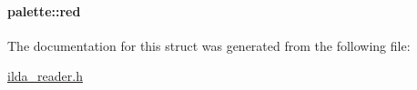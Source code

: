 \paragraph[{\texorpdfstring{red}{red}}]{ palette\+::red}\hypertarget{structpalette_a4ddb05dff589a890711966e7774e75d2}{}\label{structpalette_a4ddb05dff589a890711966e7774e75d2}


The documentation for this struct was generated from the following file\+:\begin{DoxyCompactItemize}
\item 
\hyperlink{ilda__reader_8h}{ilda\+\_\+reader.\+h}\end{DoxyCompactItemize}
